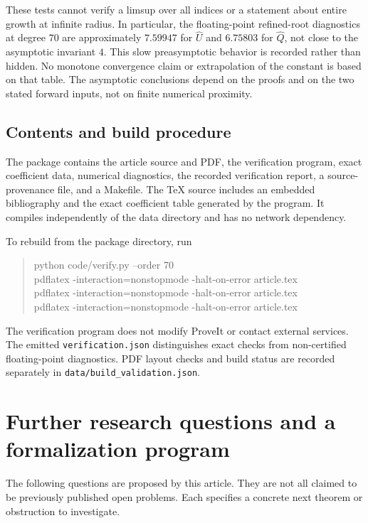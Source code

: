 \documentclass[11pt,a4paper]{article}
\numberwithin{equation}{section}
\theoremstyle{definition}
\theoremstyle{remark}
\newcommand{\Q}{\widehat Q}
\newcommand{\U}{\widehat U}
\begin{document}
These tests cannot verify a limsup over all indices or a statement about
entire growth at infinite radius. In particular, the floating-point
refined-root diagnostics at degree $70$ are approximately $7.59947$ for
$\U$ and $6.75803$ for $\Q$, not close to the asymptotic invariant $4$.
This slow preasymptotic behavior is recorded rather than hidden. No
monotone convergence claim or extrapolation of the constant is based on
that table. The asymptotic conclusions depend on the proofs and on the
two stated forward inputs, not on finite numerical proximity.

\subsection{Contents and build procedure}

The package contains the article source and PDF, the verification
program, exact coefficient data, numerical diagnostics, the recorded
verification report, a source-provenance file, and a Makefile. The TeX
source includes an embedded bibliography and the exact coefficient table
generated by the program. It compiles independently of the data directory
and has no network dependency.

To rebuild from the package directory, run
\begin{quote}\ttfamily
python code/verify.py --order 70\\
pdflatex -interaction=nonstopmode -halt-on-error article.tex\\
pdflatex -interaction=nonstopmode -halt-on-error article.tex\\
pdflatex -interaction=nonstopmode -halt-on-error article.tex
\end{quote}
The verification program does not modify ProveIt or contact external
services. The emitted \texttt{verification.json} distinguishes exact
checks from non-certified floating-point diagnostics. PDF layout checks
and build status are recorded separately in
\texttt{data/build\_validation.json}.

\section{Further research questions and a formalization program}
\label{sec:questions}

The following questions are proposed by this article. They are not all
claimed to be previously published open problems. Each specifies a
concrete next theorem or obstruction to investigate.
\end{document}
